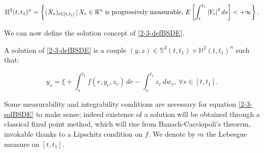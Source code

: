 \begin{equation}\label{2-3-defH}
    \mathbb{H}^2(t,t_1)^n = \left\{(X_s)_{t\in[t,t_1]}\,|\, X_s\in\mathbb{R}^n \text{ is progressively measurable},\, E\left[\int_t^{t_1} \abs{Y_s}^2\,ds\right]<+\infty\right\}.    
\end{equation}

We can now define the solution concept of \eqref{2-3-defBSDE}.

\begin{definition}
    A solution of \eqref{2-3-defBSDE} is a couple $(y,z)\in\mathbb{S}^2(t,t_1)\times\mathbb{H}^2(t,t_1)^n$ such that:
    
    \begin{equation}\label{2-3-solBSDE}
        y_s = \xi + \int_s^{t_1} f(r,y_r,z_r)\,dr - \int_s^{t_1} z_r\,dw_r,\,\forall s\in[t,t_1].
    \end{equation}  
\end{definition}

Some measurability and integrability conditions are necessary for equation \eqref{2-3-solBSDE} to make sense; indeed existence 
of a solution will be obtained through a classical fixed point method, which will rise from Banach-Cacciopoli's theorem, invokable thanks to a Lipschitz condition on $f$. 
We denote by $m$ the Lebesgue measure on $[t,t_1]$.

